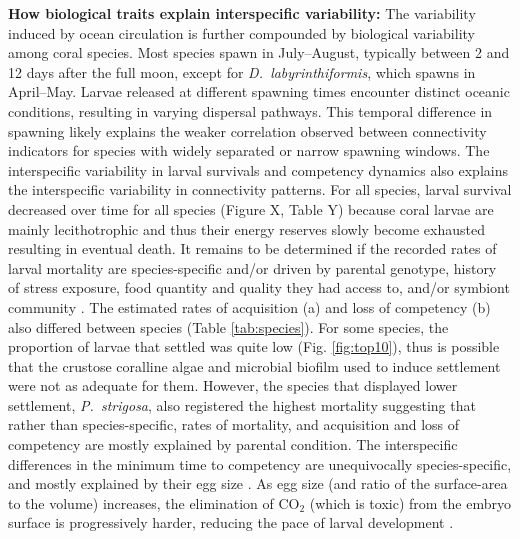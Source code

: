 \documentclass[preprint,12pt,authoryear]{elsarticle}
\begin{document}
\textbf{How biological traits explain interspecific variability:} The variability induced by ocean circulation is further compounded by biological variability among coral species. Most species spawn in July–August, typically between 2 and 12 days after the full moon, except for \textit{D.~labyrinthiformis}, which spawns in April–May. Larvae released at different spawning times encounter distinct oceanic conditions, resulting in varying dispersal pathways. This temporal difference in spawning likely explains the weaker correlation observed between connectivity indicators for species with widely separated or narrow spawning windows. The interspecific variability in larval survivals and competency dynamics also explains the interspecific variability in connectivity patterns. For all species, larval survival decreased over time for all species (Figure X, Table Y) because coral larvae are mainly lecithotrophic and thus their energy reserves slowly become exhausted resulting in eventual death. It remains to be determined if the recorded rates of larval mortality are species-specific and/or driven by parental genotype, history of stress exposure, food quantity and quality they had access to, and/or symbiont community \citep{jones2011tradeoffs, baums2013genotypic, padilla2013all, kirk2018genomic}. The estimated rates of acquisition (a) and loss of competency (b) also differed between species (Table \ref{tab:species}). For some species, the proportion of larvae that settled was quite low (Fig. \ref{fig:top10}), thus is possible that the crustose coralline algae and microbial biofilm used to induce settlement were not as adequate for them. However, the species that displayed lower settlement, \textit{P.~strigosa}, also registered the highest mortality suggesting that rather than species-specific, rates of mortality, and acquisition and loss of competency are mostly explained by parental condition. The interspecific differences in the minimum time to competency are unequivocally species-specific, and mostly explained by their egg size \citep{figueiredo2013synthesizing}. As egg size (and ratio of the surface-area to the volume) increases, the elimination of CO$_2$ (which is toxic) from the embryo surface is progressively harder, reducing the pace of larval development \citep{berrill1935cell, einum2002egg}.
\end{document}
